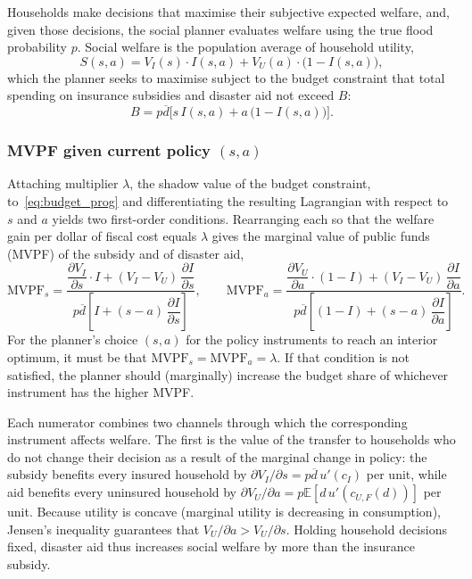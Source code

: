 \documentclass[12pt]{article}
\begin{document}
Households make decisions that maximise their subjective expected welfare, and, given those decisions, the social planner evaluates welfare using the true flood probability $p$. Social welfare is the population average of household utility,
\begin{equation}
    S(s,a) = V_I(s)\cdot I(s,a) + V_U(a)\cdot\bigl(1-I(s,a)\bigr), \label{eq:welfare_prog}
\end{equation}
which the planner seeks to maximise subject to the budget constraint that total spending on insurance subsidies and disaster aid not exceed $B$:
\begin{equation}
    B = p\overline{d}\bigl[s\,I(s,a) + a\,\bigl(1-I(s,a)\bigr)\bigr]. \label{eq:budget_prog}
\end{equation}

\subsubsection{MVPF given current policy $(s,a)$}

Attaching multiplier $\lambda$, the shadow value of the budget constraint, to~\eqref{eq:budget_prog} and differentiating the resulting Lagrangian with respect to $s$ and $a$ yields two first-order conditions. Rearranging each so that the welfare gain per dollar of fiscal cost equals $\lambda$ gives the marginal value of public funds (MVPF) of the subsidy and of disaster aid,
\begin{equation}
    \text{MVPF}_s = \frac{
        \dfrac{\partial V_I}{\partial s}\cdot I
         +  (V_I-V_U)\,\dfrac{\partial I}{\partial s}
    }{
        p\overline{d}\!\left[I + (s-a)\,\dfrac{\partial I}{\partial s}\right]
    }, \qquad
    \text{MVPF}_a = \frac{
        \dfrac{\partial V_U}{\partial a}\cdot(1-I)
         + (V_I-V_U)\,\dfrac{\partial I}{\partial a}
    }{
        p\overline{d}\!\left[(1-I) + (s-a)\,\dfrac{\partial I}{\partial a}\right]
    }. \label{eq:mvpf_prog}
\end{equation}
For the planner's choice $(s,a)$ for the policy instruments to reach an interior optimum, it must be that $\text{MVPF}_s = \text{MVPF}_a = \lambda$. If that condition is not satisfied, the planner should (marginally) increase the budget share of whichever instrument has the higher MVPF.

Each numerator combines two channels through which the corresponding instrument affects welfare. The first is the value of the transfer to households who do not change their decision as a result of the marginal change in policy: the subsidy benefits every insured household by $\partial V_I/\partial s = p\overline{d}\,u'(c_I)$ per unit, while aid benefits every uninsured household by $\partial V_U/\partial a = p\mathbb{E}[d\,u'(c_{U,F}(d))]$ per unit. Because utility is concave (marginal utility is decreasing in consumption), Jensen's inequality guarantees that $V_U/\partial a >V_U/\partial s $. Holding household decisions fixed, disaster aid thus increases social welfare by more than the insurance subsidy. 
\end{document}
